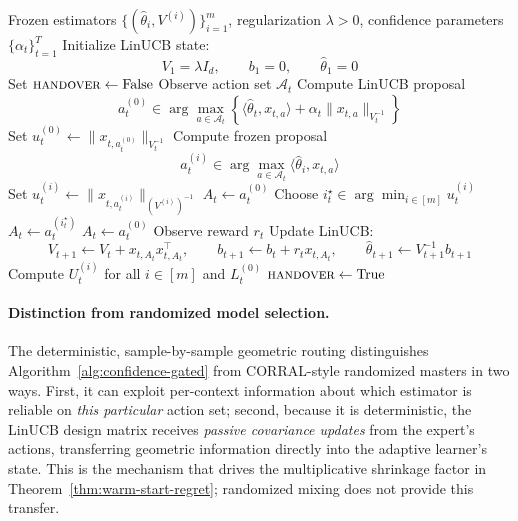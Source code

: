 \documentclass{article}
\theoremstyle{definition}
\theoremstyle{remark}
\theoremstyle{remark}
\begin{document}
\begin{algorithm}[t]
\caption{Confidence-Gated Master over Frozen Policies and LinUCB}
\label{alg:confidence-gated}
\begin{algorithmic}[1]
\Require Frozen estimators $\{(\widehat{\theta}_i,V^{(i)})\}_{i=1}^m$, regularization $\lambda>0$, confidence parameters $\{\alpha_t\}_{t=1}^T$
\State Initialize LinUCB state:
\[
V_1=\lambda I_d,\qquad b_1=0,\qquad \widehat{\theta}_1=0
\]
\State Set $\textsc{handover}\gets \mathrm{False}$
    \State Observe action set $\mathcal{A}_t$
    \State Compute LinUCB proposal
    \[
    a_t^{(0)} \in \arg\max_{a\in\mathcal{A}_t}
    \left\{
    \langle \widehat{\theta}_t,x_{t,a}\rangle
    + \alpha_t \|x_{t,a}\|_{V_t^{-1}}
    \right\}
    \]
    \State Set $u_t^{(0)} \gets \|x_{t,a_t^{(0)}}\|_{V_t^{-1}}$
        \State Compute frozen proposal
        \[
        a_t^{(i)} \in \arg\max_{a\in\mathcal{A}_t}
        \langle \widehat{\theta}_i,x_{t,a}\rangle
        \]
        \State Set $u_t^{(i)} \gets \|x_{t,a_t^{(i)}}\|_{(V^{(i)})^{-1}}$
    \EndFor
        \State $A_t \gets a_t^{(0)}$
    \Else
        \State Choose $i_t^\star \in \arg\min_{i\in[m]} u_t^{(i)}$
            \State $A_t \gets a_t^{(i_t^\star)}$
        \Else
            \State $A_t \gets a_t^{(0)}$
        \EndIf
    \EndIf
    \State Observe reward $r_t$
    \State Update LinUCB:
    \[
    V_{t+1}\gets V_t + x_{t,A_t}x_{t,A_t}^\top,
    \qquad
    b_{t+1}\gets b_t + r_t x_{t,A_t},
    \qquad
    \widehat{\theta}_{t+1}\gets V_{t+1}^{-1}b_{t+1}
    \]
    \State Compute $U_t^{(i)}$ for all $i\in[m]$ and $L_t^{(0)}$
        \State $\textsc{handover}\gets \mathrm{True}$
    \EndIf
\EndFor
\end{algorithmic}
\end{algorithm}

\paragraph{Distinction from randomized model selection.}
The deterministic, sample-by-sample geometric routing distinguishes
Algorithm~\ref{alg:confidence-gated} from CORRAL-style randomized
masters in two ways. First, it can exploit per-context information
about which estimator is reliable on \emph{this particular} action
set; second, because it is deterministic, the LinUCB design matrix
receives \emph{passive covariance updates} from the expert's actions,
transferring geometric information directly into the adaptive
learner's state. This is the mechanism that drives the multiplicative
shrinkage factor in Theorem~\ref{thm:warm-start-regret}; randomized
mixing does not provide this transfer.
\end{document}
